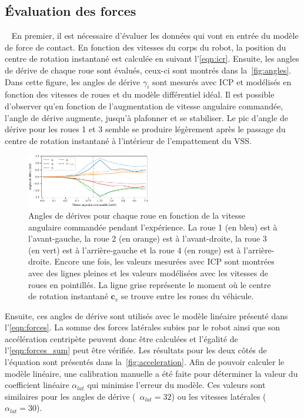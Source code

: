 \subsection{Évaluation des forces}~\label{sec:forces}
En premier, il est nécessaire d'évaluer les données qui vont en entrée du modèle de force de contact. 
En fonction des vitesses du corps du robot, la position du centre de rotation instantané est calculée en suivant l'\autoref{eqn:icr}.
Ensuite, les angles de dérive de chaque roue sont évalués, ceux-ci sont montrés dans la~\autoref{fig:angles}.
Dans cette figure, les angles de dérive $\gamma_i$ sont mesurés avec \ac{ICP} et modélisés en fonction des vitesses de roues et du modèle différentiel idéal.
Il est possible d'observer qu'en fonction de l'augmentation de vitesse angulaire commandée, l'angle de dérive augmente, jusqu'à plafonner et se stabiliser. 
Le pic d'angle de dérive pour les roues 1 et 3 semble se produire légèrement après le passage du centre de rotation instantané à l'intérieur de l'empattement du \ac{VSS}.

\begin{figure}[htpb]
	\centering
	\includegraphics[width=0.48\textwidth]{figs/slip_angles.pdf}
	\caption{Angles de dérives pour chaque roue en fonction de la vitesse angulaire commandée pendant l'expérience.
			La roue 1 (en bleu) est à l'avant-gauche, la roue 2 (en orange) est à l'avant-droite, la roue 3 (en vert) est à l'arrière-gauche et la roue 4 (en rouge) est à l'arrière-droite.
			Encore une fois, les valeurs mesurées avec \ac{ICP} sont montrées avec des lignes pleines et les valeurs modélisées avec les vitesses de roues en pointillés.
			La ligne grise représente le moment où le centre de rotation instantané $\bm c_v$ se trouve entre les roues du véhicule.}
	\label{fig:angles}
\end{figure}

Ensuite, ces angles de dérive sont utilisés avec le modèle linéaire présenté dans l'\autoref{eqn:forces}.
La somme des forces latérales subies par le robot ainsi que son accélération centripète peuvent donc être calculées et l'égalité de l'\autoref{eqn:forces_sum} peut être vérifiée.
Les résultats pour les deux côtés de l'équation sont présentés dans la~\autoref{fig:acceleration}.
Afin de pouvoir calculer le modèle linéaire, une calibration manuelle a été faite pour déterminer la valeur du coefficient linéaire $\alpha_{lat}$ qui minimise l'erreur du modèle.
Ces valeurs sont similaires pour les angles de dérive (\ie~$\alpha_{lat} = 32$) ou les vitesses latérales (\ie~$\alpha_{lat} = 30$).

